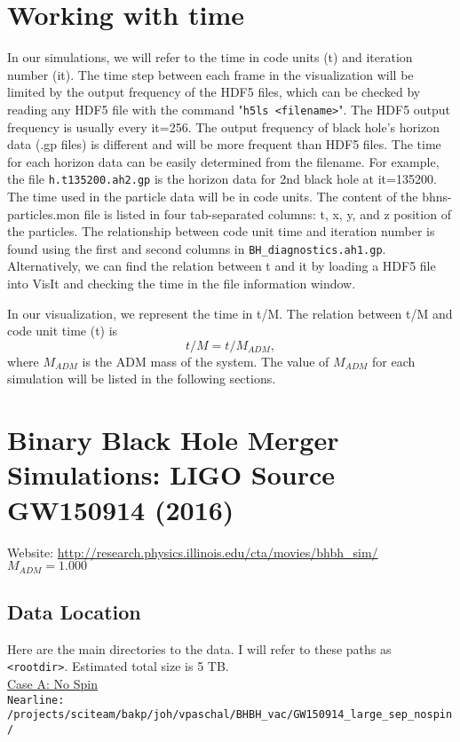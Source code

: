 \documentclass{article}
\begin{document}
\section{Working with time}

In our simulations, we will refer to the time in code units (t) and iteration number (it). The time step between each frame in the visualization will be limited by the output frequency of the HDF5 files, which can be checked by reading any HDF5 file with the command "\verb|h5ls <filename>|". The HDF5 output frequency is usually every it=256. The output frequency of black hole's horizon data (.gp files) is different and will be more frequent than HDF5 files. The time for each horizon data can be easily determined from the filename. For example, the file \verb|h.t135200.ah2.gp| is the horizon data for 2nd black hole at it=135200. The time used in the particle data will be in code units. The content of the bhns-particles.mon file is listed in four tab-separated columns: t, x, y, and z position of the particles. The relationship between code unit time and iteration number is found using the first and second columns in \verb|BH_diagnostics.ah1.gp|. Alternatively, we can find the relation between t and it by loading a HDF5 file into VisIt and checking the time in the file information window.

In our visualization, we represent the time in t/M. The relation between t/M and code unit time (t) is \[ t/M = t/M_{ADM} , \] where $M_{ADM}$ is the ADM mass of the system. The value of $M_{ADM}$ for each simulation will be listed in the following sections.



\section{Binary Black Hole Merger Simulations: LIGO Source GW150914 (2016)}

Website: \url{http://research.physics.illinois.edu/cta/movies/bhbh_sim/} \\
$M_{ADM} = 1.000$

\subsection{Data Location}
Here are the main directories to the data. I will refer to these paths as \verb|<rootdir>|. Estimated total size is 5 TB.\\

\underline{Case A: No Spin} \\
	\verb|Nearline: /projects/sciteam/bakp/joh/vpaschal/BHBH_vac/GW150914_large_sep_nospin/| \\
\end{document}
